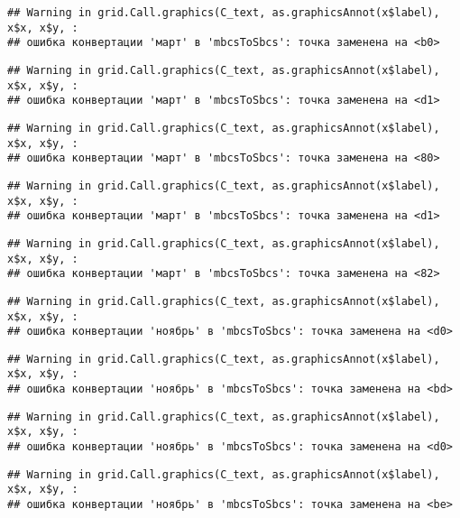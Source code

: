\documentclass[
]{article}
\begin{document}
\begin{verbatim}
## Warning in grid.Call.graphics(C_text, as.graphicsAnnot(x$label), x$x, x$y, :
## ошибка конвертации 'март' в 'mbcsToSbcs': точка заменена на <b0>
\end{verbatim}

\begin{verbatim}
## Warning in grid.Call.graphics(C_text, as.graphicsAnnot(x$label), x$x, x$y, :
## ошибка конвертации 'март' в 'mbcsToSbcs': точка заменена на <d1>
\end{verbatim}

\begin{verbatim}
## Warning in grid.Call.graphics(C_text, as.graphicsAnnot(x$label), x$x, x$y, :
## ошибка конвертации 'март' в 'mbcsToSbcs': точка заменена на <80>
\end{verbatim}

\begin{verbatim}
## Warning in grid.Call.graphics(C_text, as.graphicsAnnot(x$label), x$x, x$y, :
## ошибка конвертации 'март' в 'mbcsToSbcs': точка заменена на <d1>
\end{verbatim}

\begin{verbatim}
## Warning in grid.Call.graphics(C_text, as.graphicsAnnot(x$label), x$x, x$y, :
## ошибка конвертации 'март' в 'mbcsToSbcs': точка заменена на <82>
\end{verbatim}

\begin{verbatim}
## Warning in grid.Call.graphics(C_text, as.graphicsAnnot(x$label), x$x, x$y, :
## ошибка конвертации 'ноябрь' в 'mbcsToSbcs': точка заменена на <d0>
\end{verbatim}

\begin{verbatim}
## Warning in grid.Call.graphics(C_text, as.graphicsAnnot(x$label), x$x, x$y, :
## ошибка конвертации 'ноябрь' в 'mbcsToSbcs': точка заменена на <bd>
\end{verbatim}

\begin{verbatim}
## Warning in grid.Call.graphics(C_text, as.graphicsAnnot(x$label), x$x, x$y, :
## ошибка конвертации 'ноябрь' в 'mbcsToSbcs': точка заменена на <d0>
\end{verbatim}

\begin{verbatim}
## Warning in grid.Call.graphics(C_text, as.graphicsAnnot(x$label), x$x, x$y, :
## ошибка конвертации 'ноябрь' в 'mbcsToSbcs': точка заменена на <be>
\end{verbatim}
\end{document}
